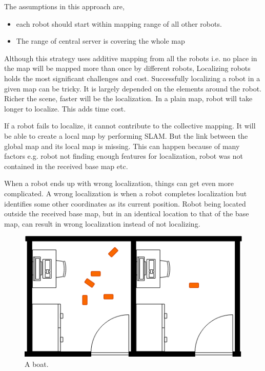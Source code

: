 \documentclass[MTech]{iitmdiss}
\begin{document}
The assumptions in this approach are,
\begin{itemize}
    \item each robot should start within mapping range of all other robots.
    \item The range of central server is covering the whole map
\end{itemize}
Although this strategy uses additive mapping from all the robots i.e. no place in the map will be mapped more than once by different robots, Localizing robots holds the most significant challenges and cost. Successfully localizing a robot in a given map can be tricky. It is largely depended on the elements around the robot. Richer the scene, faster will be the localization. In a plain map, robot will take longer to localize. This adds time cost.\par
If a robot fails to localize, it cannot contribute to the collective mapping. It will be able to create a local map by performing SLAM. But the link between the global map and its local map is missing. This can happen because of many factors e.g. robot not finding enough features for localization, robot was not contained in the received base map etc.\par
When a robot ends up with wrong localization, things can get even more complicated. A wrong localization is when a robot completes localization but identifies some other coordinates as its current position. Robot being located outside the received base map, but in an identical location to that of the base map, can result in wrong localization instead of not localizing.\par

\begin{figure}
  \includegraphics[width=\linewidth]{WrongLocalization}
  \caption{A boat.}
  \label{fig:boat1}
\end{figure}
\end{document}
